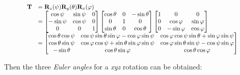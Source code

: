 \begin{enumerate}
        \begin{equation}
            \scalebox{0.85}{
                $ \begin{array}{ll}
                    \mathbf{T}
                    &= \mathbf{R}_{z}(\psi)\mathbf{R}_{y}(\theta)\mathbf{R}_{x}(\varphi) \\
                    &=
                    \begin{bmatrix}
                        \cos \psi & \sin \psi & 0 \\
                        -\sin \psi & \cos \psi & 0 \\
                        0 & 0 & 1
                    \end{bmatrix}
                    \begin{bmatrix}
                        \cos \theta & 0 & -\sin \theta \\
                        0 & 1 & 0 \\
                        \sin \theta & 0 & \cos \theta
                    \end{bmatrix}
                    \begin{bmatrix}
                        1 & 0 & 0 \\
                        0 & \cos \varphi & \sin \varphi \\
                        0 & -\sin \varphi & \cos \varphi
                    \end{bmatrix} \\
                    &=
                    \begin{bmatrix}
                        \cos \theta \cos \psi
                        & \cos \psi \sin \theta \sin \varphi - \cos \varphi \sin \psi
                        & \cos \varphi \cos \psi \sin \theta + \sin \varphi \sin \psi \\
                        \cos \theta \sin \psi
                        & \cos \varphi \cos \psi + \sin \theta \sin \varphi \sin \psi
                        & \cos \varphi \sin \theta \sin \psi - \cos \psi \sin \varphi \\
                        -\sin \theta
                        & \cos \theta \sin \varphi
                        & \cos \theta \cos \varphi
                    \end{bmatrix}
                \end{array} $
            }
        \end{equation}

        Then the three \textit{Euler angles} for a \textit{xyz} rotation
        can be obtained:


\end{enumerate}
